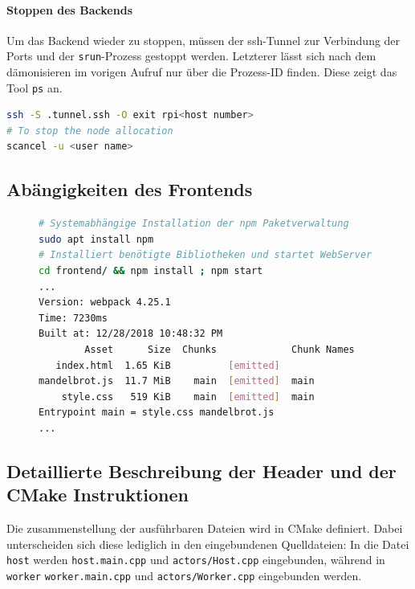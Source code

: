 \paragraph{Stoppen des Backends}

Um das Backend wieder zu stoppen, müssen der ssh-Tunnel zur Verbindung der Ports
und der \verb|srun|-Prozess gestoppt werden.
Letzterer lässt sich nach dem dämonisieren im vorigen Aufruf nur über die Prozess-ID finden.
Diese zeigt das Tool \verb|ps| an.
\begin{lstlisting}[language=bash]
ssh -S .tunnel.ssh -O exit rpi<host number>
# To stop the node allocation
scancel -u <user name>
\end{lstlisting}

\subsection{Abängigkeiten des Frontends}
\begin{figure}[h!]
	\begin{lstlisting}[language=bash, caption={Starten des Frontends mit beispielhafter Ausgabe}]
# Systemabhängige Installation der npm Paketverwaltung
sudo apt install npm
# Installiert benötigte Bibliotheken und startet WebServer
cd frontend/ && npm install ; npm start
...
Version: webpack 4.25.1
Time: 7230ms
Built at: 12/28/2018 10:48:32 PM
        Asset      Size  Chunks             Chunk Names
   index.html  1.65 KiB          [emitted]
mandelbrot.js  11.7 MiB    main  [emitted]  main
    style.css   519 KiB    main  [emitted]  main
Entrypoint main = style.css mandelbrot.js
...
        \end{lstlisting}
\end{figure}
\begin{figure}[h!]
	
\end{figure}

\subsection{Detaillierte Beschreibung der Header und der CMake Instruktionen}

Die zusammenstellung der ausführbaren Dateien wird in CMake definiert.
Dabei unterscheiden sich diese lediglich in den eingebundenen Quelldateien:
In die Datei \verb|host| werden \verb|host.main.cpp| und \verb|actors/Host.cpp| eingebunden, während
in \verb|worker| \verb|worker.main.cpp| und \verb|actors/Worker.cpp| eingebunden werden.

